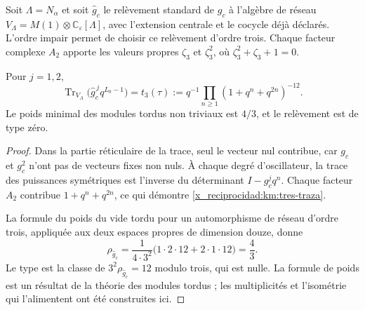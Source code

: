 Soit \(\Lambda=N_\alpha\) et soit \(\widehat g_c\) le relèvement
standard de \(g_c\) à l'algèbre de réseau
\(V_\Lambda=M(1)\otimes\mathbb C_\varepsilon[\Lambda]\), avec
l'extension centrale et le cocycle déjà déclarés. L'ordre impair permet
de choisir ce relèvement d'ordre trois. Chaque facteur complexe \(A_2\)
apporte les valeurs propres \(\zeta_3\) et \(\zeta_3^2\), où
\(\zeta_3^2+\zeta_3+1=0\).

\begin{proposition}
\label{x_reciprocidad:km:traza-tipo}
Pour \(j=1,2\),
\begin{equation}
 \operatorname{Tr}_{V_\Lambda}
       \bigl(\widehat g_c^{\,j}q^{L_0-1}\bigr)
 =t_3(\tau)
 :=q^{-1}\prod_{n\ge1}(1+q^n+q^{2n})^{-12}.
 \label{x_reciprocidad:km:tres-traza}
\end{equation}
Le poids minimal des modules tordus non triviaux est \(4/3\), et
le relèvement est de type zéro.
\end{proposition}
\begin{proof}
Dans la partie réticulaire de la trace, seul le vecteur nul contribue,
car \(g_c\) et \(g_c^2\) n'ont pas de vecteurs fixes non nuls.
À chaque degré d'oscillateur, la trace des puissances symétriques est l'inverse
du déterminant \(I-g_c^jq^n\). Chaque facteur \(A_2\) contribue
\(1+q^n+q^{2n}\), ce qui démontre \eqref{x_reciprocidad:km:tres-traza}.

La formule du poids du vide tordu pour un automorphisme de réseau d'ordre trois, appliquée aux deux espaces propres de dimension douze, donne
\[
 \rho_{\widehat g_c}
 =\frac{1}{4\cdot3^2}
   \bigl(1\cdot2\cdot12+2\cdot1\cdot12\bigr)=\frac43.
\]
Le type est la classe de \(3^2\rho_{\widehat g_c}=12\) modulo
trois, qui est nulle. La formule de poids est un résultat de la théorie des
modules tordus ; les multiplicités et l'isométrie qui l'alimentent
ont été construites ici.
\end{proof}

